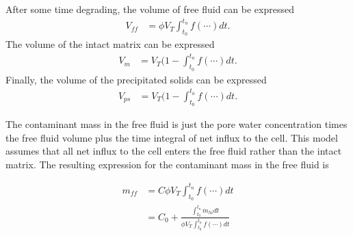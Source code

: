 After some time degrading, the volume of free fluid can be expressed 
\begin{align}
V_{ff} &= \phi V_T \int_{t_0}^{t_n} f(\cdots) dt.
\label{vff}
\end{align}
The volume of the intact matrix can be expressed
\begin{align}
V_m &= V_T(1-\int_{t_0}^{t_n} f(\cdots) dt.
\label{vm}
\end{align}
Finally, the volume of the precipitated solids can be expressed
\begin{align}
V_{ps} &= V_T(1-\int_{t_0}^{t_n} f(\cdots) dt.
\label{vps}
\end{align}

The contaminant mass in the free fluid is just the pore water concentration 
times the free fluid volume plus the time integral of net influx to the cell. 
This model assumes that all net influx to the cell enters the free fluid rather 
than the intact matrix. The resulting expression for the contaminant mass in the 
free fluid is 

\begin{align}
m_{ff} &= C\phi V_T\int_{t_0}^{t_n}f(\cdots)dt\nonumber\\ 
       &= C_0 + \frac{\int_{t_0}^{t_n} \dot{m}_{hi} dt}{\phi V_T\int_{t_0}^{t_n} f(\cdots)dt}
\label{mff}
\end{align}
